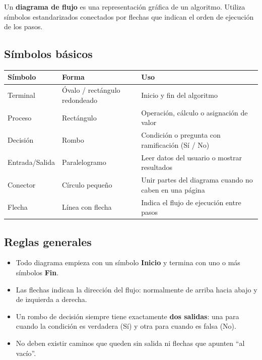Un \textbf{diagrama de flujo} es una representación gráfica de un algoritmo. Utiliza símbolos estandarizados conectados por flechas que indican el orden de ejecución de los pasos.

\subsection{Símbolos básicos}

\begin{table}[H]
\centering
\begin{tabular}{lp{4cm}p{6cm}}
\toprule
Símbolo & Forma & Uso \\
\midrule
Terminal & Óvalo / rectángulo redondeado & Inicio y fin del algoritmo \\
Proceso & Rectángulo & Operación, cálculo o asignación de valor \\
Decisión & Rombo & Condición o pregunta con ramificación (Sí / No) \\
Entrada/Salida & Paralelogramo & Leer datos del usuario o mostrar resultados \\
Conector & Círculo pequeño & Unir partes del diagrama cuando no caben en una página \\
Flecha & Línea con flecha & Indica el flujo de ejecución entre pasos \\
\bottomrule
\end{tabular}
\end{table}


\subsection{Reglas generales}

\begin{itemize}
    \item Todo diagrama empieza con un símbolo \textbf{Inicio} y termina con uno o más símbolos \textbf{Fin}.
    \item Las flechas indican la dirección del flujo: normalmente de arriba hacia abajo y de izquierda a derecha.
    \item Un rombo de decisión siempre tiene exactamente \textbf{dos salidas}: una para cuando la condición es verdadera (Sí) y otra para cuando es falsa (No).
    \item No deben existir caminos que queden sin salida ni flechas que apunten ``al vacío''.
\end{itemize}

